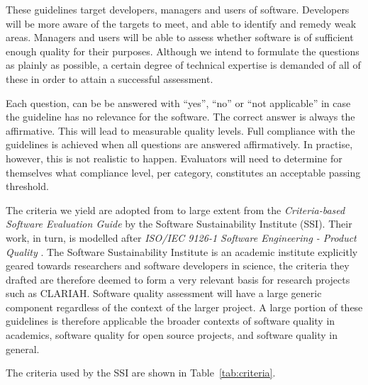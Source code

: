 \documentclass[a4paper,11pt]{article}
\begin{document}
These guidelines target developers, managers and users of software.
Developers will be more aware of the targets to meet, and able to identify and
remedy weak areas. Managers and users will be able to assess whether software
is of sufficient enough quality for their purposes. Although we intend to
formulate the questions as plainly as possible, a certain degree of technical
expertise is demanded of all of these in order to attain a successful
assessment.

Each question, can be be answered with ``yes'', ``no'' or ``not applicable'' in
case the guideline has no relevance for the software. The correct answer is
always the affirmative. This will lead to measurable quality levels. Full
compliance with the guidelines is achieved when all questions are answered
affirmatively.  In practise, however, this is not realistic to happen.
Evaluators will need to determine for themselves what compliance level, per
category, constitutes an acceptable passing threshold.

The criteria we yield are adopted from to large extent from the
\emph{Criteria-based Software Evaluation Guide} \citep{SSIGUIDE} by the Software
Sustainability Institute (SSI). Their work, in turn, is modelled after
\emph{ISO/IEC 9126-1 Software Engineering - Product Quality} \citep{ISO9126}.
The Software Sustainability Institute\citep{SSIGENERAL} is an academic institute
explicitly geared towards researchers and software developers in science, the
criteria they drafted are therefore deemed to form a very relevant basis for
research projects such as CLARIAH. Software quality assessment will have a
large generic component regardless of the context of the larger project. A
large portion of these guidelines is therefore applicable the broader contexts
of software quality in academics, software quality for open source projects, and
software quality in general.

The criteria used by the SSI are shown in Table~\ref{tab:criteria}.
\end{document}
